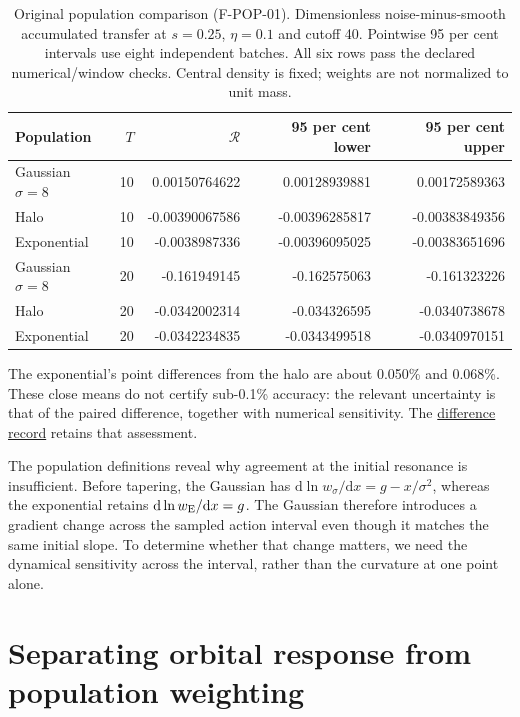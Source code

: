 \documentclass[fleqn,usenatbib]{mnras}
\begin{document}
\begin{table}
\centering
\caption{Original population comparison (F-POP-01). Dimensionless noise-minus-smooth accumulated transfer at $s=0.25$, $\eta=0.1$ and cutoff 40. Pointwise 95 per cent intervals use eight independent batches. All six rows pass the declared numerical/window checks. Central density is fixed; weights are not normalized to unit mass.}\label{tab-pop}
\small
\setlength{\tabcolsep}{4pt}
\begin{tabular}{lrrrr}
\toprule
Population & $T$ & $\mathcal R$ & 95 per cent lower & 95 per cent upper \\
\midrule
Gaussian $\sigma=8$ & 10 & 0.00150764622 & 0.00128939881 & 0.00172589363 \\
Halo & 10 & -0.00390067586 & -0.00396285817 & -0.00383849356 \\
Exponential & 10 & -0.0038987336 & -0.00396095025 & -0.00383651696 \\
Gaussian $\sigma=8$ & 20 & -0.161949145 & -0.162575063 & -0.161323226 \\
Halo & 20 & -0.0342002314 & -0.034326595 & -0.0340738678 \\
Exponential & 20 & -0.0342234835 & -0.0343499518 & -0.0340970151 \\
\bottomrule
\end{tabular}
\end{table}

The exponential's point differences from the halo are about 0.050\% and 0.068\%. These close means do not certify sub-0.1\% accuracy: the relevant uncertainty is that of the paired difference, together with numerical sensitivity. The \href{https://djova.ca/galaxy-bar/diagnostics/population-accuracy/joint-error-assessment.json}{difference record} retains that assessment.

The population definitions reveal why agreement at the initial resonance is insufficient. Before tapering, the Gaussian has \(\mathrm d\ln w_\sigma/\mathrm dx=g-x/\sigma^2\), whereas the exponential retains \(\mathrm d\ln w_{\rm E}/\mathrm dx=g\). The Gaussian therefore introduces a gradient change across the sampled action interval even though it matches the same initial slope. To determine whether that change matters, we need the dynamical sensitivity across the interval, rather than the curvature at one point alone.

\section{Separating orbital response from population weighting}\label{kernel}
\end{document}
